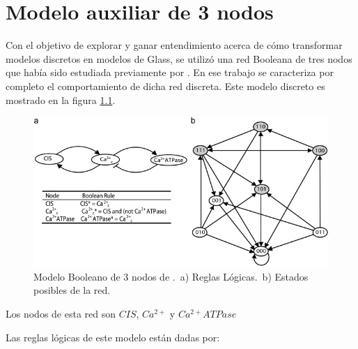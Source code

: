 \chapter{Modelo auxiliar de 3 nodos}\label{ch:3Nodos}

Con el objetivo de explorar y ganar entendimiento acerca de cómo transformar modelos discretos en modelos de Glass, se utilizó una red Booleana de tres nodos que había sido estudiada previamente por \citeauthor{Reka3Nodos2010} \citep{Reka3Nodos2010}. En ese trabajo se caracteriza por completo el comportamiento de dicha red discreta. Este modelo discreto es mostrado en la figura \ref{fig:red3reka}.

\begin{figure}[hbt]
\includegraphics[width=0.9\linewidth]{gfx/red3nodos}
\caption[Modelo Booleano de 3 nodos]{Modelo Booleano de 3 nodos de \citeauthor{Reka3Nodos2010} \citep{Reka3Nodos2010}.\ a) Reglas L\'ogicas.\ b) Estados posibles de la red.}\label{fig:red3reka}
\end{figure}

Los nodos de esta red son $CIS$, $Ca^{2+}$ y $Ca^{2+}ATPase$

Las reglas lógicas de este modelo están dadas por:







